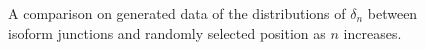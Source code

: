 \begin{figure}[hp!]
    \begin{center}
        
    \end{center}
    \caption{A comparison on generated data of the distributions of $\delta_n$ between isoform junctions and randomly selected position as $n$ increases.}
    \label{boxplots_generated}
\end{figure} 